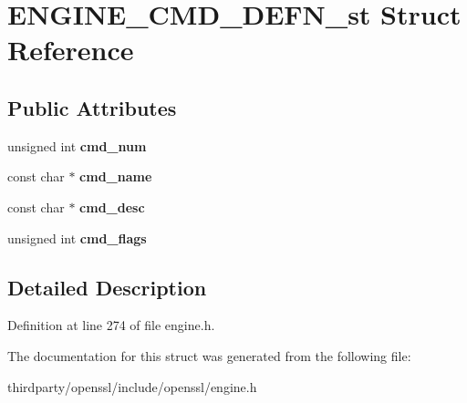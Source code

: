\hypertarget{struct_e_n_g_i_n_e___c_m_d___d_e_f_n__st}{}\section{E\+N\+G\+I\+N\+E\+\_\+\+C\+M\+D\+\_\+\+D\+E\+F\+N\+\_\+st Struct Reference}
\label{struct_e_n_g_i_n_e___c_m_d___d_e_f_n__st}
\subsection*{Public Attributes}
\begin{DoxyCompactItemize}
\item 
\mbox{\label{struct_e_n_g_i_n_e___c_m_d___d_e_f_n__st_a4868776e2cc8f219c161072902b27761}} 
unsigned int {\bfseries cmd\+\_\+num}
\item 
\mbox{\label{struct_e_n_g_i_n_e___c_m_d___d_e_f_n__st_a852b7bb98dcb5c946e4574f33cbc40ac}} 
const char $\ast$ {\bfseries cmd\+\_\+name}
\item 
\mbox{\label{struct_e_n_g_i_n_e___c_m_d___d_e_f_n__st_aeb668f4e30209755aa41b7fba3cd2895}} 
const char $\ast$ {\bfseries cmd\+\_\+desc}
\item 
\mbox{\label{struct_e_n_g_i_n_e___c_m_d___d_e_f_n__st_aa2dae056d36094415cdc11e6c7cac4a5}} 
unsigned int {\bfseries cmd\+\_\+flags}
\end{DoxyCompactItemize}


\subsection{Detailed Description}


Definition at line 274 of file engine.\+h.



The documentation for this struct was generated from the following file\+:\begin{DoxyCompactItemize}
\item 
thirdparty/openssl/include/openssl/engine.\+h\end{DoxyCompactItemize}
